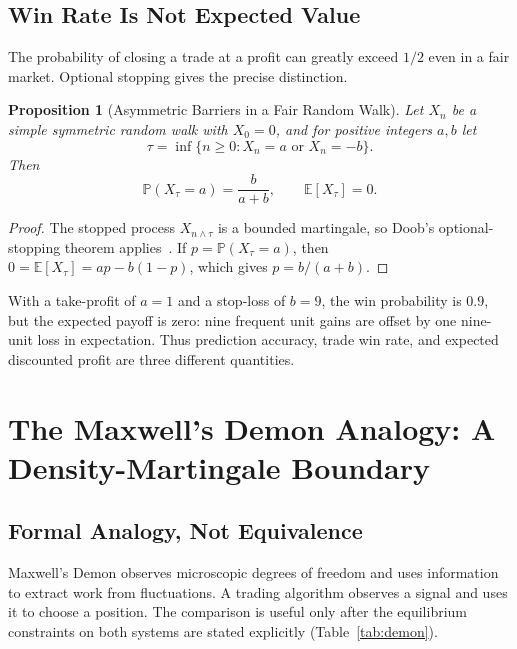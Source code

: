 \documentclass[aps,pra,reprint,superscriptaddress,amsmath,amssymb]{revtex4-2}
\theoremstyle{plain}
\newtheorem{proposition}[theorem]{Proposition}
\theoremstyle{definition}
\theoremstyle{remark}
\begin{document}
\subsection{Win Rate Is Not Expected Value}

The probability of closing a trade at a profit can greatly exceed \(1/2\)
even in a fair market. Optional stopping gives the precise distinction.

\begin{proposition}[Asymmetric Barriers in a Fair Random Walk]
  \label{prop:optional}
  Let \(X_n\) be a simple symmetric random walk with \(X_0=0\), and for positive
  integers \(a,b\) let
  \[
    \tau=\inf\{n\geq0:X_n=a\text{ or }X_n=-b\}.
  \]
  Then
  \begin{equation}
    \mathbb{P}(X_\tau=a)=\frac{b}{a+b},
    \qquad
    \mathbb{E}[X_\tau]=0.
    \label{eq:gambler}
  \end{equation}
\end{proposition}

\begin{proof}
The stopped process \(X_{n\wedge\tau}\) is a bounded martingale, so Doob's
optional-stopping theorem applies~\cite{Doob1953}. If
\(p=\mathbb{P}(X_\tau=a)\), then
\(0=\mathbb{E}[X_\tau]=ap-b(1-p)\), which gives
\(p=b/(a+b)\).
\end{proof}

With a take-profit of \(a=1\) and a stop-loss of \(b=9\), the win probability
is \(0.9\), but the expected payoff is zero: nine frequent unit gains are
offset by one nine-unit loss in expectation. Thus prediction accuracy, trade
win rate, and expected discounted profit are three different quantities.

\section{The Maxwell's Demon Analogy: A Density-Martingale Boundary}
\label{sec:demon}

\subsection{Formal Analogy, Not Equivalence}

Maxwell's Demon observes microscopic degrees of freedom and uses information
to extract work from fluctuations. A trading algorithm observes a signal and
uses it to choose a position. The comparison is useful only after the
equilibrium constraints on both systems are stated explicitly
(Table~\ref{tab:demon}).
\end{document}
